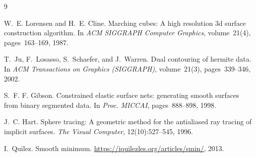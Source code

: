 \documentclass[10pt,a4paper]{article}
\begin{document}
\begin{thebibliography}{9}

W.~E. Lorensen and H.~E. Cline.
\newblock Marching cubes: A high resolution 3d surface construction algorithm.
\newblock In \emph{ACM SIGGRAPH Computer Graphics}, volume~21(4), pages~163--169,
  1987.

T.~Ju, F.~Losasso, S.~Schaefer, and J.~Warren.
\newblock Dual contouring of hermite data.
\newblock In \emph{ACM Transactions on Graphics (SIGGRAPH)}, volume~21(3),
  pages~339--346, 2002.

S.~F. F. Gibson.
\newblock Constrained elastic surface nets: generating smooth surfaces from
  binary segmented data.
\newblock In \emph{Proc. MICCAI}, pages~888--898, 1998.

J.~C. Hart.
\newblock Sphere tracing: A geometric method for the antialiased ray tracing of
  implicit surfaces.
\newblock \emph{The Visual Computer}, 12(10):527--545, 1996.

I.~Quilez.
\newblock Smooth minimum.
\newblock \url{https://iquilezles.org/articles/smin/}, 2013.

\end{thebibliography}
\end{document}

